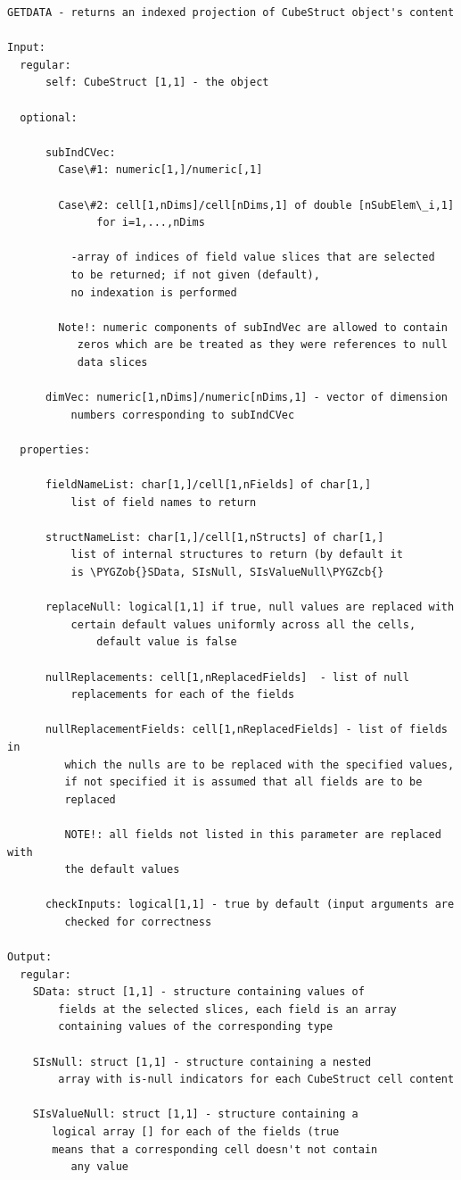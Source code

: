 \documentclass[letterpaper,10pt,english]{sphinxmanual}
\def\PYGZob{\char`\{}
\def\PYGZcb{\char`\}}
\begin{document}
\begin{Verbatim}[commandchars=\\\{\}]
GETDATA - returns an indexed projection of CubeStruct object's content

Input:
  regular:
      self: CubeStruct [1,1] - the object

  optional:

      subIndCVec:
        Case\#1: numeric[1,]/numeric[,1]

        Case\#2: cell[1,nDims]/cell[nDims,1] of double [nSubElem\_i,1]
              for i=1,...,nDims

          -array of indices of field value slices that are selected
          to be returned; if not given (default),
          no indexation is performed

        Note!: numeric components of subIndVec are allowed to contain
           zeros which are be treated as they were references to null
           data slices

      dimVec: numeric[1,nDims]/numeric[nDims,1] - vector of dimension
          numbers corresponding to subIndCVec

  properties:

      fieldNameList: char[1,]/cell[1,nFields] of char[1,]
          list of field names to return

      structNameList: char[1,]/cell[1,nStructs] of char[1,]
          list of internal structures to return (by default it
          is \PYGZob{}SData, SIsNull, SIsValueNull\PYGZcb{}

      replaceNull: logical[1,1] if true, null values are replaced with
          certain default values uniformly across all the cells,
              default value is false

      nullReplacements: cell[1,nReplacedFields]  - list of null
          replacements for each of the fields

      nullReplacementFields: cell[1,nReplacedFields] - list of fields in
         which the nulls are to be replaced with the specified values,
         if not specified it is assumed that all fields are to be
         replaced

         NOTE!: all fields not listed in this parameter are replaced with
         the default values

      checkInputs: logical[1,1] - true by default (input arguments are
         checked for correctness

Output:
  regular:
    SData: struct [1,1] - structure containing values of
        fields at the selected slices, each field is an array
        containing values of the corresponding type

    SIsNull: struct [1,1] - structure containing a nested
        array with is-null indicators for each CubeStruct cell content

    SIsValueNull: struct [1,1] - structure containing a
       logical array [] for each of the fields (true
       means that a corresponding cell doesn't not contain
          any value
\end{Verbatim}
\end{document}
